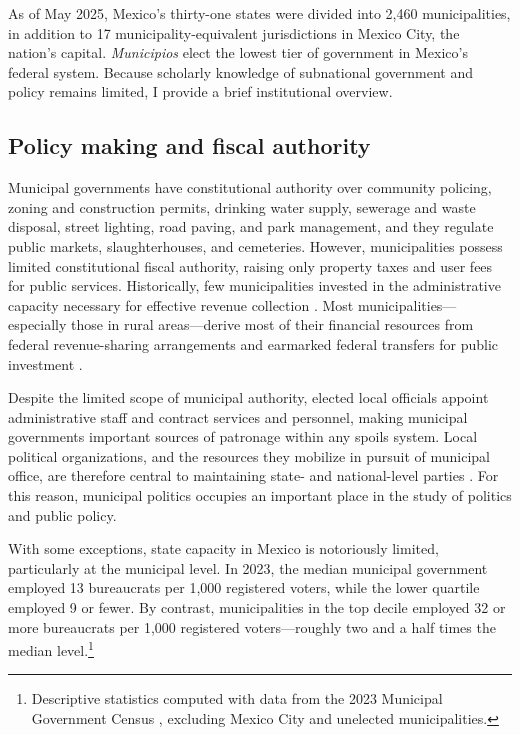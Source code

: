 \documentclass[letter,12pt]{article}
\begin{document}
As of May 2025, Mexico's thirty-one states were divided into 2,460 municipalities, in addition to 17 municipality-equivalent jurisdictions in Mexico City, the nation's capital. \emph{Municipios} elect the lowest tier of government in Mexico's federal system. Because scholarly knowledge of subnational government and policy remains limited, I provide a brief institutional overview.

\subsection{Policy making and fiscal authority}

Municipal governments have constitutional authority over community policing, zoning and construction permits, drinking water supply, sewerage and waste disposal, street lighting, road paving, and park management, and they regulate public markets, slaughterhouses, and cemeteries. However, municipalities possess limited constitutional fiscal authority, raising only property taxes and user fees for public services. Historically, few municipalities invested in the administrative capacity necessary for effective revenue collection \citep{garfias.state.cap.2018}. Most municipalities---especially those in rural areas---derive most of their financial resources from federal revenue-sharing arrangements and earmarked federal transfers for public investment \citep{diaz.cayeros.2006, figueroa-mansur-itam.2024}.

Despite the limited scope of municipal authority, elected local officials appoint administrative staff and contract services and personnel, making municipal governments important sources of patronage within any spoils system. Local political organizations, and the resources they mobilize in pursuit of municipal office, are therefore central to maintaining state- and national-level parties \citep{ames.1970, coppedge.MxVen.1993, key.1964, rosas.lucardi.Brokers.2019}. For this reason, municipal politics occupies an important place in the study of politics and public policy.

With some exceptions, state capacity in Mexico is notoriously limited, particularly at the municipal level. In 2023, the median municipal government employed 13 bureaucrats per 1,000 registered voters, while the lower quartile employed 9 or fewer. By contrast, municipalities in the top decile employed 32 or more bureaucrats per 1,000 registered voters---roughly two and a half times the median level.\footnote{Descriptive statistics computed with data from the 2023 Municipal Government Census \citep{inegi.CensoGobMun2023}, excluding Mexico City and unelected municipalities.}
\end{document}
